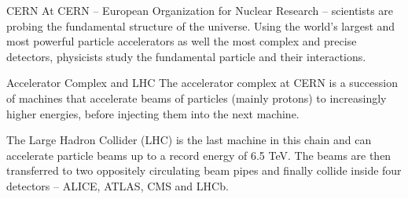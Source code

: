 

\begin{frame}
	\begin{block}{CERN}
		At CERN -- European Organization for Nuclear Research -- scientists are probing the fundamental structure of the universe. Using the world's largest and most powerful particle accelerators as well the most complex and precise detectors, physicists study the fundamental particle and their interactions.
	\end{block}
	\begin{block}{Accelerator Complex and LHC}
		The accelerator complex at CERN is a succession of machines that accelerate beams of particles (mainly protons) to increasingly higher energies, before injecting them into the next machine.
		
		The Large Hadron Collider (LHC) is the last machine in this chain and can accelerate particle beams up to a record energy of 6.5 TeV. The beams are then transferred to two oppositely circulating beam pipes and finally collide inside four detectors -- ALICE, ATLAS, CMS and LHCb.
	\end{block}
\end{frame}


